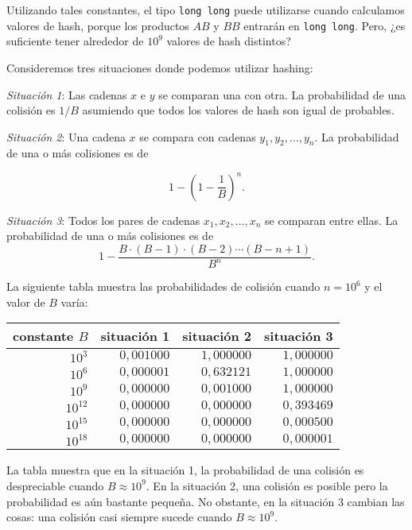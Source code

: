 Utilizando tales constantes, el tipo \texttt{long long} puede utilizarse
cuando calculamos valores de hash, porque los productos $AB$ y $BB$
entrarán en \texttt{long long}. Pero, ¿es suficiente tener alrededor
de $10^9$ valores de hash distintos?

Consideremos tres situaciones donde podemos utilizar hashing:

\textit{Situación 1}: Las cadenas $x$ e $y$ se comparan una con otra.
La probabilidad de una colisión es $1/B$ asumiendo que todos los valores
de hash son igual de probables.

\textit{Situación 2}: Una cadena $x$ se compara con cadenas
$y_1,y_2,\ldots,y_n$. La probabilidad de una o más colisiones es de

\[1-\left(1-\frac{1}{B}\right)^n.\]

\textit{Situación 3}: Todos los pares de cadenas $x_1,x_2,\ldots,x_n$
se comparan entre ellas. La probabilidad de una o más colisiones es de
\[ 1 - \frac{B \cdot (B-1) \cdot (B-2) \cdots (B-n+1)}{B^n}.\]

La siguiente tabla muestra las probabilidades de colisión cuando
$n=10^6$ y el valor de $B$ varía:

\begin{center}
    \begin{tabular}{rrrr}
        constante $B$ & situación 1 & situación 2 & situación 3 \\
        \hline
        $10^3$        & $0,001000$  & $1,000000$  & $1,000000$  \\
        $10^6$        & $0,000001$  & $0,632121$  & $1,000000$  \\
        $10^9$        & $0,000000$  & $0,001000$  & $1,000000$  \\
        $10^{12}$     & $0,000000$  & $0,000000$  & $0,393469$  \\
        $10^{15}$     & $0,000000$  & $0,000000$  & $0,000500$  \\
        $10^{18}$     & $0,000000$  & $0,000000$  & $0,000001$  \\
    \end{tabular}
\end{center}

La tabla muestra que en la situación 1, la probabilidad de una colisión
es despreciable cuando $B \approx 10^9$. En la situación 2, una colisión
es posible pero la probabilidad es aún bastante pequeña. No obstante, en
la situación 3 cambian las cosas: una colisión casi siempre sucede cuando
$B \approx 10^9$.

